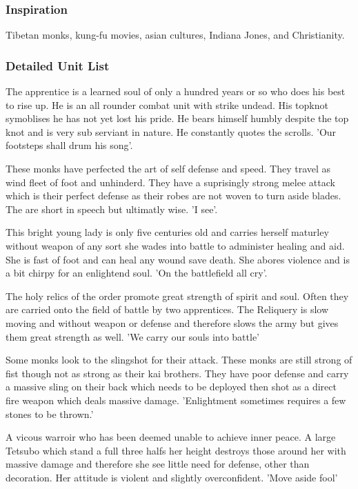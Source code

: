 \documentclass[a4paper,twocolumn]{article}
\begin{document}
\subsubsection{Inspiration}
Tibetan monks, kung-fu movies, asian cultures, Indiana Jones, and Christianity.

\subsubsection{Detailed Unit List}

The apprentice is a learned soul of only a hundred years or so who does his best to rise up. He is an all rounder combat unit with strike undead. His topknot symoblises he has not yet lost his pride. He bears himself humbly despite the top knot and is very sub serviant in nature. He constantly quotes the scrolls. 'Our footsteps shall drum his song'.

These monks have perfected the art of self defense and speed. They travel as wind fleet of foot and unhinderd. They have a suprisingly strong melee attack which is their perfect defense as their robes are not woven to turn aside blades. The are short in speech but ultimatly wise.  'I see'.

This bright young lady is only five centuries old and carries herself maturley without weapon of any sort she wades into battle to administer healing and aid. She is fast of foot and can heal any wound save death. She abores violence and is a bit chirpy for an enlightend soul. 'On the battlefield all cry'.

The holy relics of the order promote great strength of spirit and soul. Often they are carried onto the field of battle by two apprentices. The Reliquery is slow moving and without weapon or defense and therefore slows the army but gives them great strength as well. 'We carry our souls into battle'

Some monks look to the slingshot for their attack. These monks are still strong of fist though not as strong as their kai brothers. They have poor defense and carry a massive sling on their back which needs to be deployed then shot as a direct fire weapon which deals massive damage. 'Enlightment sometimes requires a few stones to be thrown.'

A vicous warroir who has been deemed unable to achieve inner peace. A large Tetsubo which stand a full three halfs her height destroys those around her with massive damage and therefore she see little need for defense, other than decoration. Her attitude is violent and slightly overconfident. 'Move aside fool'
\end{document}
